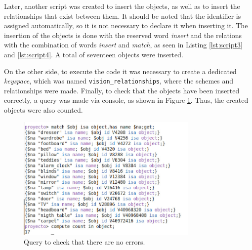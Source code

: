 Later, another script was created to insert the objects, as well as to insert 
the relationships that exist between them. It should be noted that the 
identifier is assigned automatically, so it is not necessary to declare 
it when inserting it. The insertion of the objects is done with the reserved 
word \textit{insert} and the relations with the combination of words 
\textit{insert} and \textit{match}, as seen in Listing \ref{lst:script3} and 
\ref{lst:script4}. A total of seventeen objects were inserted.





On the other side, to execute the code it was necessary to create a dedicated 
\textit{keyspace}, which was named \texttt{vision\_relationships}, where the 
schemes and relationships were made. Finally, to check that the objects have 
been inserted correctly, a query was made via console, as shown in Figure 
\ref{fig:correct}. Thus, the created objects were also counted.

\begin{figure}[H]
     \centering
     \includegraphics[width=8.8cm]{figures/numObje.jpeg}
     \caption{Query to check that there are no errors.}
     \label{fig:correct}
\end{figure}